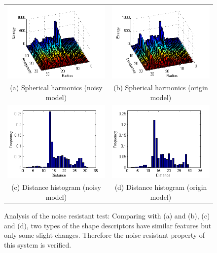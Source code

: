 \begin{figure}
\begin{center}
\begin{tabular}{cc}   %
   \includegraphics[width=0.45\linewidth]{noiseinvariant_test_SH10_denoise} & 
   \includegraphics[width=0.45\linewidth]{noiseinvariant_test_SH10_origin}  \\
   (a) Spherical harmonics (noisy model) & (b) Spherical harmonics (origin model)\\
   \includegraphics[width=0.45\linewidth]{noiseinvariant_test_DH10_denoise} &
   \includegraphics[width=0.45\linewidth]{noiseinvariant_test_DH10_origin}  \\
   (c) Distance histogram (noisy model) & (d) Distance histogram (origin model)\\
\end{tabular}
\caption{Analysis of the noise resistant test: Comparing with (a) and (b), (c) and (d), two types of the shape descriptors have similar features but only some slight changes. Therefore the noise resistant property of this system is verified. } 
  \label{noiseinvarianttest_analysis}
\end{center}
\end{figure}

